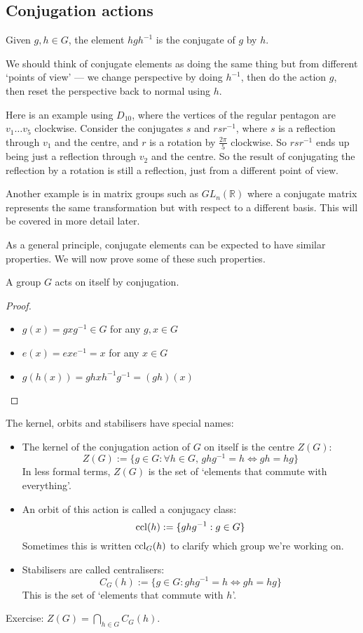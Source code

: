 \subsection{Conjugation actions}
\begin{definition}
	Given \(g, h \in G\), the element \(hgh^{-1}\) is the conjugate of \(g\) by \(h\).
\end{definition}
We should think of conjugate elements as doing the same thing but from different `points of view' --- we change perspective by doing \(h^{-1}\), then do the action \(g\), then reset the perspective back to normal using \(h\).

Here is an example using \(D_{10}\), where the vertices of the regular pentagon are \(v_1 \dots v_5\) clockwise.
Consider the conjugates \(s\) and \(rsr^{-1}\), where \(s\) is a reflection through \(v_1\) and the centre, and \(r\) is a rotation by \(\frac{2\pi}{5}\) clockwise.
So \(rsr^{-1}\) ends up being just a reflection through \(v_2\) and the centre.
So the result of conjugating the reflection by a rotation is still a reflection, just from a different point of view.

Another example is in matrix groups such as \(GL_n(\mathbb R)\) where a conjugate matrix represents the same transformation but with respect to a different basis.
This will be covered in more detail later.

As a general principle, conjugate elements can be expected to have similar properties.
We will now prove some of these such properties.
\begin{proposition}
	A group \(G\) acts on itself by conjugation.
\end{proposition}
\begin{proof}
	\begin{itemize}
		\item \(g(x) = gxg^{-1} \in G\) for any \(g, x \in G\)
		\item \(e(x) = exe^{-1} = x\) for any \(x \in G\)
		\item \(g(h(x)) = ghxh^{-1}g^{-1} = (gh)(x)\)
	\end{itemize}
\end{proof}
\begin{definition}
	The kernel, orbits and stabilisers have special names:
	\begin{itemize}
		\item The kernel of the conjugation action of \(G\) on itself is the centre \(Z(G)\):
		      \[
			      Z(G) := \{ g \in G : \forall h \in G,\, ghg^{-1} = h \iff gh=hg \}
		      \]
		      In less formal terms, \(Z(G)\) is the set of `elements that commute with everything'.
		\item An orbit of this action is called a conjugacy class:
		      \[
			      \operatorname{ccl}(h) := \{ ghg^{-1}: g \in G \}
		      \]
		      Sometimes this is written \(\operatorname{ccl}_G(h)\) to clarify which group we're working on.
		\item Stabilisers are called centralisers:
		      \[
			      C_G(h) := \{ g \in G : ghg^{-1} = h \iff gh = hg \}
		      \]
		      This is the set of `elements that commute with \(h\)'.
	\end{itemize}
\end{definition}
Exercise: \(Z(G) = \bigcap_{h \in G} C_G(h)\).

